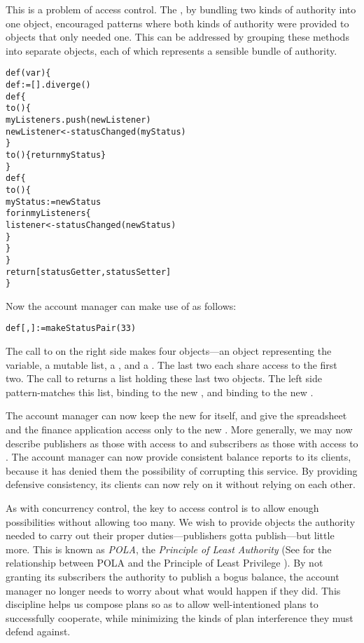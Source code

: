 \documentclass{llncs}
\begin{document}
This is a problem of access control. The , by
bundling two kinds of authority into one object, encouraged patterns
where both kinds of authority were provided to objects that only
needed one. This can be addressed by grouping these methods into
separate objects, each of which represents a sensible bundle of
authority.
%
\begin{alltt}
    def (var ) \{
        def  := [].diverge()
        def  \{
            to () \{
                myListeners.push(newListener)
                newListener <- statusChanged(myStatus)
            \}
            to () \{ return myStatus \}
        \}
        def  \{
            to () \{
                myStatus := newStatus
                for  in myListeners \{
                    listener <- statusChanged(newStatus)
                \}
            \}
        \}
        return [statusGetter, statusSetter]
    \}
\end{alltt}
%
Now the account manager can make use of  as
follows:
%
\begin{alltt}
    def [, ] := makeStatusPair(33)
\end{alltt}
%
The call to  on the right side makes four
objects---an object representing the  variable, a
mutable  list, a , and a
. The last two each share access to the first
two. The call to  returns a list holding these
last two objects. The left side pattern-matches this list, binding
 to the new , and binding 
to the new .

The account manager can now keep the new  for
itself, and give the spreadsheet and the finance application access
only to the new . More generally, we may now
describe publishers as those with access to  and
subscribers as those with access to . The account
manager can now provide consistent balance reports to its clients,
because it has denied them the possibility of corrupting this
service. By providing defensive consistency, its clients can now rely
on it without relying on each other.

As with concurrency control, the key to access control is to allow
enough possibilities without allowing too many. We wish to provide
objects the authority needed to carry out their proper
duties---publishers gotta publish---but little more. This is known as
\emph{POLA}, the \emph{Principle of Least Authority} (See
\cite{miller:paradigm} for the relationship between POLA and the
Principle of Least Privilege \cite{SaltzerSc75}). By not granting its
subscribers the authority to publish a bogus balance, the account
manager no longer needs to worry about what would happen if they
did. This discipline helps us compose plans so as to allow
well-intentioned plans to successfully cooperate, while minimizing the
kinds of plan interference they must defend against.
\end{document}
